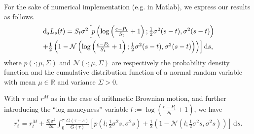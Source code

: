 \documentclass[openany,oneside]{article}
\theoremstyle{definition}
\theoremstyle{remark}
\newcommand{\ts}{\textstyle}
\newcommand{\de}{\,\mathrm{d}}
\begin{document}
{\color{red}
For the sake of numerical implementation (e.g. in Matlab), we express our results as follows.
\begin{multline*}
\ts \de_s L_s(t) = S_t\sigma^2 \Bigl[p\left(\log\left(\frac{c-P_t}{S_t}+1 \right); \frac{1}{2}\sigma^2(s-t), \sigma^2(s-t)\right)\\
   \ts + \frac{1}{2}\left(1-\mathcal{N}\left(\log\left(\frac{c-P_t}{S_t}+1 \right); \frac{1}{2}\sigma^2(s-t), \sigma^2(s-t)\right)\right)\Bigr] \de s,
\end{multline*}
where $p(\cdot;\mu,\Sigma)$ and $\mathcal{N}(\cdot;\mu, \Sigma)$ are respectively the probability density function and the cumulative distribution function of a normal random variable with mean $\mu\in\mathbb{R}$ and variance $\Sigma>0$.

With $\tau$ and $r^M$ as in the case of arithmetic Brownian motion, and further introducing the ``log-moneyness'' variable $l:=\log\left(\frac{c-P_t}{S_t}+1\right)$, we have
\begin{align*}
\ts r^\ast_t = r^M_t + \frac{S_t\sigma^2}{2\kappa}\int_0^\tau \frac{G(\tau-s)}{G(\tau)}\left[p(l;\frac{1}{2}\sigma^2 s, \sigma^2 s)+\frac{1}{2}(1-\mathcal{N}(l;\frac{1}{2}\sigma^2 s, \sigma^2 s))\right] \de s.
\end{align*}
}
\end{document}
